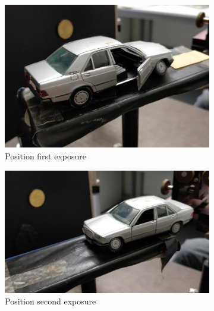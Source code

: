 \documentclass[11pt,a4paper]{article}
\begin{document}
\begin{figure}[ht]
\centering
\begin{subfigure}[b]{0.45\textwidth}
\includegraphics[width=\textwidth]{car_double_exposure_1}
\caption{Position first exposure}
\label{fig:car_knight}
\end{subfigure}
\begin{subfigure}[b]{0.45\textwidth}
\includegraphics[width=\textwidth]{car_double_exposure_2}
\caption{Position second exposure}
\label{fig:off_axis_hologram}
\end{subfigure}\\\vspace{.2cm}
\begin{subfigure}[b]{0.45\textwidth}

\end{subfigure}
\end{figure}
\end{document}
